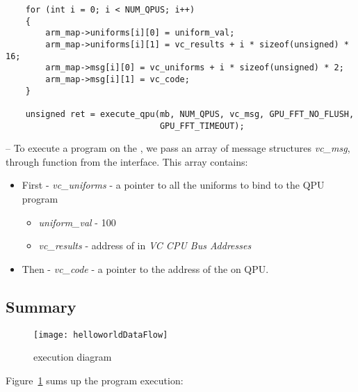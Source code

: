 \begin{lstlisting}
    for (int i = 0; i < NUM_QPUS; i++)
    {
        arm_map->uniforms[i][0] = uniform_val;
        arm_map->uniforms[i][1] = vc_results + i * sizeof(unsigned) * 16;
        arm_map->msg[i][0] = vc_uniforms + i * sizeof(unsigned) * 2;
        arm_map->msg[i][1] = vc_code;
    }

    unsigned ret = execute_qpu(mb, NUM_QPUS, vc_msg, GPU_FFT_NO_FLUSH,
                               GPU_FFT_TIMEOUT);
\end{lstlisting}
-- To execute a \qpu{} program on the , we pass an array of message structures \emph{vc\_msg}, through  function from the \mail{} interface. This array contains:
\begin{itemize}
	\item First - \emph{vc\_uniforms} - a pointer to all the uniforms to bind to the QPU program
	\begin{itemize}
		\item \emph{uniform\_val} - 100
		\item \emph{vc\_results} - address of  in \emph{VC CPU Bus Addresses}
	\end{itemize}
\item Then - \emph{vc\_code} - a pointer to the address of the  on QPU.
\end{itemize}


\subsection{Summary}

\begin{figure}[!htbp]
	\centering
	\texttt{[image: helloworldDataFlow]}
	\caption{ execution diagram}
	\label{flowFigure}
\end{figure}
\FloatBarrier


Figure~\ref{flowFigure} sums up the  program execution:

